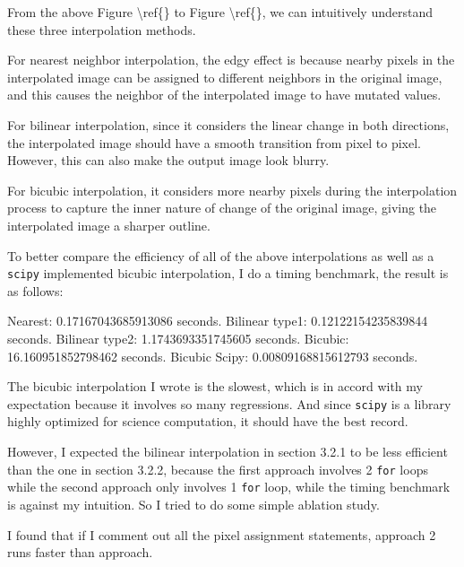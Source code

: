 \documentclass[
]{article}
\newenvironment{Shaded}{}{}
\newcommand{\FloatTok}[1]{\textcolor[rgb]{0.25,0.63,0.44}{#1}}
\newcommand{\NormalTok}[1]{#1}
\begin{document}
From the above Figure \textbackslash ref\{\} to Figure
\textbackslash ref\{\}, we can intuitively understand these three
interpolation methods.

For nearest neighbor interpolation, the edgy effect is because nearby
pixels in the interpolated image can be assigned to different neighbors
in the original image, and this causes the neighbor of the interpolated
image to have mutated values.

For bilinear interpolation, since it considers the linear change in both
directions, the interpolated image should have a smooth transition from
pixel to pixel. However, this can also make the output image look
blurry.

For bicubic interpolation, it considers more nearby pixels during the
interpolation process to capture the inner nature of change of the
original image, giving the interpolated image a sharper outline.

To better compare the efficiency of all of the above interpolations as
well as a \texttt{scipy} implemented bicubic interpolation, I do a
timing benchmark, the result is as follows:

\begin{Shaded}
\begin{Highlighting}[]
\NormalTok{Nearest: }\FloatTok{0.17167043685913086}\NormalTok{ seconds.}
\NormalTok{Bilinear type1: }\FloatTok{0.12122154235839844}\NormalTok{ seconds.}
\NormalTok{Bilinear type2: }\FloatTok{1.1743693351745605}\NormalTok{ seconds.}
\NormalTok{Bicubic: }\FloatTok{16.160951852798462}\NormalTok{ seconds.}
\NormalTok{Bicubic Scipy: }\FloatTok{0.00809168815612793}\NormalTok{ seconds.}
\end{Highlighting}
\end{Shaded}

The bicubic interpolation I wrote is the slowest, which is in accord
with my expectation because it involves so many regressions. And since
\texttt{scipy} is a library highly optimized for science computation, it
should have the best record.

However, I expected the bilinear interpolation in section 3.2.1 to be
less efficient than the one in section 3.2.2, because the first approach
involves 2 \texttt{for} loops while the second approach only involves 1
\texttt{for} loop, while the timing benchmark is against my intuition.
So I tried to do some simple ablation study.

I found that if I comment out all the pixel assignment statements,
approach 2 runs faster than approach.
\end{document}
